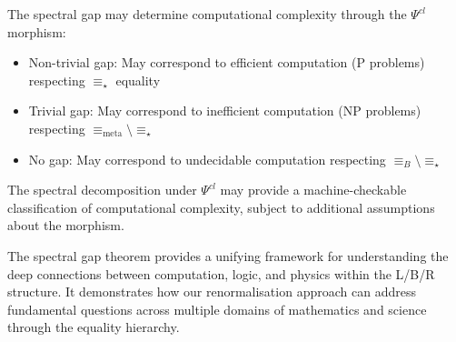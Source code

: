 \begin{theorem}
\label{thm:spectral-complexity-lbr}
The spectral gap may determine computational complexity through the $\Psi^{cl}$ morphism:
\begin{itemize}
\item Non-trivial gap: May correspond to efficient computation (P problems) respecting $\equiv_\star$ equality
\item Trivial gap: May correspond to inefficient computation (NP problems) respecting $\equiv_{\text{meta}} \setminus \equiv_\star$
\item No gap: May correspond to undecidable computation respecting $\equiv_B \setminus \equiv_\star$
\end{itemize}
The spectral decomposition under $\Psi^{cl}$ may provide a machine-checkable classification of computational complexity, subject to additional assumptions about the morphism.
\end{theorem}

The spectral gap theorem provides a unifying framework for understanding the deep connections between computation, logic, and physics within the L/B/R structure. It demonstrates how our renormalisation approach can address fundamental questions across multiple domains of mathematics and science through the equality hierarchy.
